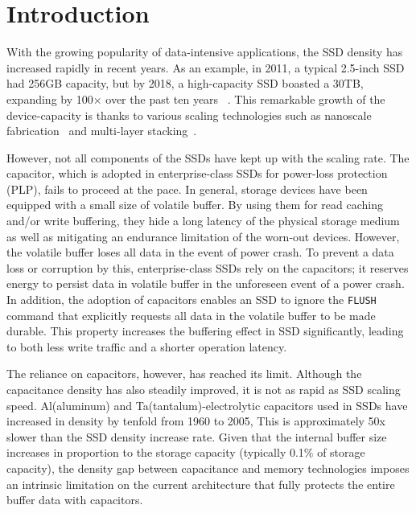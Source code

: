 \section{Introduction}

With the growing popularity of data-intensive applications, the SSD density has increased rapidly in recent years.
As an example, in 2011, a typical 2.5-inch SSD had 256GB capacity, but
by 2018, a high-capacity SSD boasted a 30TB, expanding by 100× over the past ten years
~\cite{samsung2011, anandtech18samsung}. 
This remarkable growth of the device-capacity is thanks to various scaling technologies 
such as nanoscale fabrication~\cite{busche2014design} and multi-layer stacking~\cite{9365809}. 


However, not all components of the SSDs have kept up with the scaling rate.
The capacitor, which is adopted in enterprise-class SSDs for power-loss protection (PLP), fails to proceed at the pace. In general, storage devices 
have been equipped with a small size of volatile buffer. By using them for read caching and/or write buffering, they hide a long latency of the physical storage medium 
as well as mitigating an endurance limitation of the worn-out devices. 
However, the volatile buffer loses all data in the event of power crash. 
To prevent a data loss or corruption by this, enterprise-class SSDs
rely on the capacitors; it reserves energy to persist data in volatile buffer 
in the unforeseen event of a power crash. 
In addition, the adoption of capacitors enables an SSD to ignore the \texttt{FLUSH} command that explicitly requests all data in the volatile buffer to be made durable.
This property increases the buffering effect in SSD significantly, leading to both less write traffic and a shorter operation latency.

The reliance on capacitors, however, has reached its limit. 
Although the capacitance density has also steadily improved, 
it is not as rapid as SSD scaling speed. 
Al(aluminum) and Ta(tantalum)-electrolytic capacitors used in SSDs 
have increased in density by tenfold from 1960 to 2005,
This is approximately 50x slower than the SSD density increase rate.
Given that the internal buffer size increases in proportion to the storage capacity (typically 0.1\% of storage capacity),
the density gap between capacitance and memory technologies 
imposes an intrinsic limitation on the current architecture that 
fully protects the entire buffer data with capacitors. 


